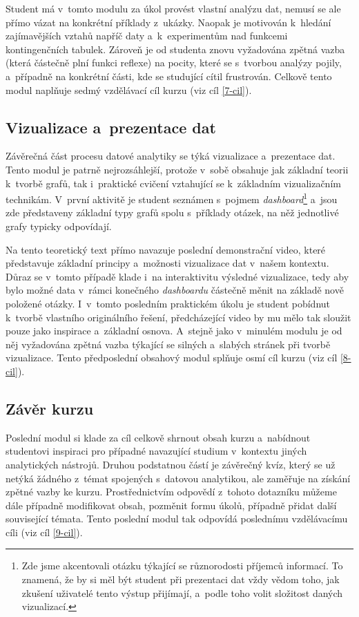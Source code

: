 Student má v~tomto modulu za úkol provést vlastní analýzu dat, nemusí se ale přímo vázat na konkrétní příklady z~ukázky. Naopak je motivován k~hledání zajímavějších vztahů napříč daty a~k~experimentům nad funkcemi kontingenčních tabulek. Zároveň je od studenta znovu vyžadována zpětná vazba (která částečně plní funkci reflexe) na pocity, které se s~tvorbou analýzy pojily, a~případně na konkrétní části, kde se studující cítil frustrován. Celkově tento modul naplňuje sedmý vzdělávací cíl kurzu (viz cíl \ref{7-cil}).

\hypertarget{vizualizace-a-prezentace-dat}{%
\subsection{Vizualizace a~prezentace dat}\label{vizualizace-a-prezentace-dat}}

Závěrečná část procesu datové analytiky se týká vizualizace a~prezentace dat. Tento modul je patrně nejrozsáhlejší, protože v~sobě obsahuje jak základní teorii k~tvorbě grafů, tak i~praktické cvičení vztahující se k~základním vizualizačním technikám. V~první aktivitě je student seznámen s~pojmem \emph{dashboard}\footnote{Zde jsme akcentovali otázku týkající se různorodosti příjemců informací. To znamená, že by si měl být student při prezentaci dat vždy vědom toho, jak zkušení uživatelé tento výstup přijímají, a~podle toho volit složitost daných vizualizací.} a~jsou zde představeny základní typy grafů spolu s~příklady otázek, na něž jednotlivé grafy typicky odpovídají.

Na tento teoretický text přímo navazuje poslední demonstrační video, které představuje základní principy a~možnosti vizualizace dat v~našem kontextu. Důraz se v~tomto případě klade i~na interaktivitu výsledné vizualizace, tedy aby bylo možné data v~rámci konečného \emph{dashboardu} částečně měnit na základě nově položené otázky. I~v~tomto posledním praktickém úkolu je student pobídnut k~tvorbě vlastního originálního řešení, předcházející video by mu mělo tak sloužit pouze jako inspirace a~základní osnova. A~stejně jako v~minulém modulu je od něj vyžadována zpětná vazba týkající se silných a~slabých stránek při tvorbě vizualizace. Tento předposlední obsahový modul splňuje osmí cíl kurzu (viz cíl \ref{8-cil}).

\hypertarget{zuxe1vux11br-kurzu}{%
\subsection{Závěr kurzu}\label{zuxe1vux11br-kurzu}}

Poslední modul si klade za cíl celkově shrnout obsah kurzu a~nabídnout studentovi inspiraci pro případné navazující studium v~kontextu jiných analytických nástrojů. Druhou podstatnou částí je závěrečný kvíz, který se už netýká žádného z~témat spojených s~datovou analytikou, ale zaměřuje na získání zpětné vazby ke kurzu. Prostřednictvím odpovědí z~tohoto dotazníku můžeme dále případně modifikovat obsah, pozměnit formu úkolů, případně přidat další související témata. Tento poslední modul tak odpovídá poslednímu vzdělávacímu cíli (viz cíl \ref{9-cil}).
